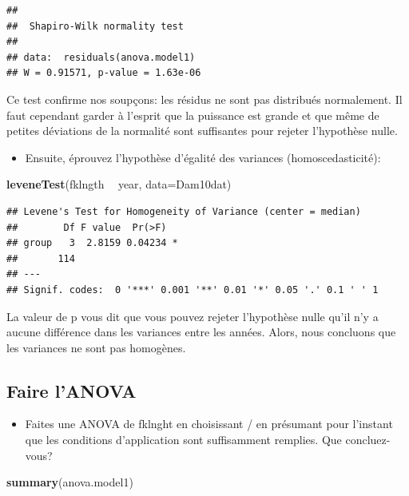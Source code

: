\documentclass[12pt,]{book}
\newenvironment{Shaded}{\begin{snugshade}}{\end{snugshade}}
\newcommand{\DataTypeTok}[1]{\textcolor[rgb]{0.27,0.27,0.27}{#1}}
\newcommand{\KeywordTok}[1]{\textcolor[rgb]{0.27,0.27,0.27}{\textbf{#1}}}
\newcommand{\NormalTok}[1]{#1}
\newcommand{\OperatorTok}[1]{\textcolor[rgb]{0.43,0.43,0.43}{\textbf{#1}}}
\newcommand{\StringTok}[1]{\textcolor[rgb]{0.5,0.5,0.5}{#1}}
\providecommand{\tightlist}{%
  \setlength{\itemsep}{0pt}\setlength{\parskip}{0pt}}
\begin{document}
\begin{verbatim}
## 
## 	Shapiro-Wilk normality test
## 
## data:  residuals(anova.model1)
## W = 0.91571, p-value = 1.63e-06
\end{verbatim}

Ce test confirme nos soupçons: les résidus ne sont pas distribués normalement. Il faut cependant garder à l'esprit que la puissance est grande et que même de petites déviations de la normalité sont suffisantes pour rejeter l'hypothèse nulle.

\begin{itemize}
\tightlist
\item
  Ensuite, éprouvez l'hypothèse d'égalité des variances (homoscedasticité):
\end{itemize}

\begin{Shaded}
\begin{Highlighting}[]
\KeywordTok{leveneTest}\NormalTok{(fklngth }\OperatorTok{~}\StringTok{ }\NormalTok{year, }\DataTypeTok{data=}\NormalTok{Dam10dat)}
\end{Highlighting}
\end{Shaded}

\begin{verbatim}
## Levene's Test for Homogeneity of Variance (center = median)
##        Df F value  Pr(>F)  
## group   3  2.8159 0.04234 *
##       114                  
## ---
## Signif. codes:  0 '***' 0.001 '**' 0.01 '*' 0.05 '.' 0.1 ' ' 1
\end{verbatim}

La valeur de p vous dit que vous pouvez rejeter l'hypothèse nulle qu'il n'y a aucune différence dans les variances entre les années. Alors, nous concluons que les variances ne sont pas homogènes.

\hypertarget{faire-lanova}{%
\subsection{Faire l'ANOVA}\label{faire-lanova}}

\begin{itemize}
\tightlist
\item
  Faites une ANOVA de fklnght en choisissant / en présumant pour l'instant que les conditions d'application sont suffisamment remplies. Que concluez-vous?
\end{itemize}

\begin{Shaded}
\begin{Highlighting}[]
\KeywordTok{summary}\NormalTok{(anova.model1)}
\end{Highlighting}
\end{Shaded}
\end{document}

